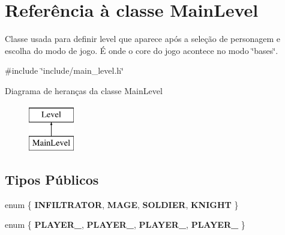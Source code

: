 \hypertarget{classMainLevel}{}\section{Referência à classe Main\+Level}
\label{classMainLevel}


Classe usada para definir level que aparece após a seleção de personagem e escolha do modo de jogo. É onde o core do jogo acontece no modo \char`\"{}bases\char`\"{}.  




{\ttfamily \#include \char`\"{}include/main\+\_\+level.\+h\char`\"{}}

Diagrama de heranças da classe Main\+Level\begin{figure}[H]
\begin{center}
\leavevmode
\includegraphics[height=2.000000cm]{classMainLevel}
\end{center}
\end{figure}
\subsection*{Tipos Públicos}
\begin{DoxyCompactItemize}
\item 
\mbox{\label{classMainLevel_a19d15012888b099ef2d53e1a0e7d1b97}} 
enum \{ {\bfseries I\+N\+F\+I\+L\+T\+R\+A\+T\+OR}, 
{\bfseries M\+A\+GE}, 
{\bfseries S\+O\+L\+D\+I\+ER}, 
{\bfseries K\+N\+I\+G\+HT}
 \}
\item 
\mbox{\label{classMainLevel_a25d9f3e3c424008626bd8bfc5c3e9dac}} 
enum \{ {\bfseries P\+L\+A\+Y\+E\+R\+\_}, 
{\bfseries P\+L\+A\+Y\+E\+R\+\_}, 
{\bfseries P\+L\+A\+Y\+E\+R\+\_}, 
{\bfseries P\+L\+A\+Y\+E\+R\+\_}
 \}
\end{DoxyCompactItemize}
